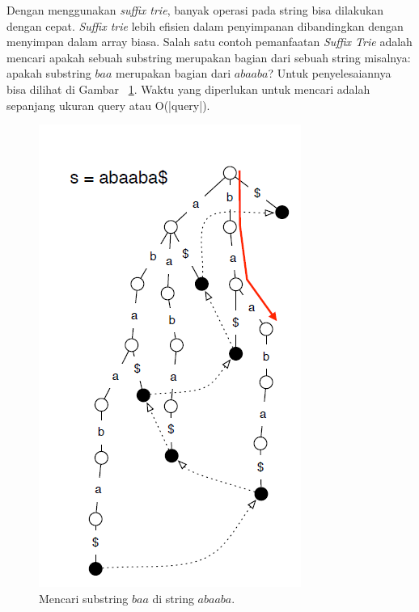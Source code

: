 Dengan menggunakan \textit{suffix trie}, banyak operasi pada string bisa dilakukan dengan cepat. \textit{Suffix trie} lebih efisien dalam penyimpanan dibandingkan dengan menyimpan dalam array biasa. Salah satu contoh pemanfaatan \textit{Suffix Trie} adalah mencari apakah sebuah substring merupakan bagian dari sebuah string misalnya: apakah substring $baa$ merupakan bagian dari $abaaba$? Untuk penyelesaiannya bisa dilihat di Gambar ~\ref{fig:suffixtriefindbaa}. Waktu yang diperlukan untuk mencari adalah sepanjang ukuran query atau O(|query|).

	\begin{figure}
		\includegraphics[width=\textwidth,keepaspectratio]{fig/suffixtriefindbaa.png}%
		\caption{Mencari substring $baa$ di string $abaaba$.}%
		\label{fig:suffixtriefindbaa}%
	\end{figure}

